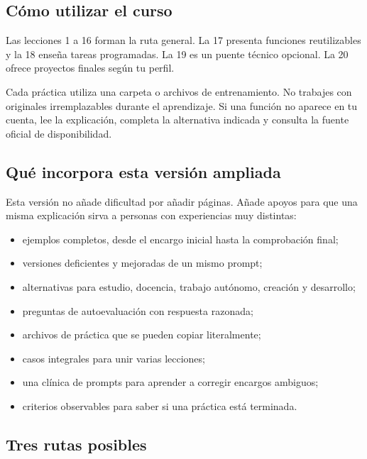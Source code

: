 \documentclass[10pt,a4paper,openany]{book}
\providecommand{\tightlist}{\setlength{\itemsep}{0.18em}\setlength{\parskip}{0pt}}
\begin{document}
\subsection{Cómo utilizar el curso}\label{cuxf3mo-utilizar-el-curso}

Las lecciones 1 a 16 forman la ruta general. La 17 presenta funciones
reutilizables y la 18 enseña tareas programadas. La 19 es un puente
técnico opcional. La 20 ofrece proyectos finales según tu perfil.

Cada práctica utiliza una carpeta o archivos de entrenamiento. No
trabajes con originales irremplazables durante el aprendizaje. Si una
función no aparece en tu cuenta, lee la explicación, completa la
alternativa indicada y consulta la fuente oficial de disponibilidad.

\subsection{Qué incorpora esta versión
ampliada}\label{quuxe9-incorpora-esta-versiuxf3n-ampliada}

Esta versión no añade dificultad por añadir páginas. Añade apoyos para
que una misma explicación sirva a personas con experiencias muy
distintas:

\begin{itemize}
\tightlist
\item
  ejemplos completos, desde el encargo inicial hasta la comprobación
  final;
\item
  versiones deficientes y mejoradas de un mismo prompt;
\item
  alternativas para estudio, docencia, trabajo autónomo, creación y
  desarrollo;
\item
  preguntas de autoevaluación con respuesta razonada;
\item
  archivos de práctica que se pueden copiar literalmente;
\item
  casos integrales para unir varias lecciones;
\item
  una clínica de prompts para aprender a corregir encargos ambiguos;
\item
  criterios observables para saber si una práctica está terminada.
\end{itemize}

\subsection{Tres rutas posibles}\label{tres-rutas-posibles}
\end{document}
